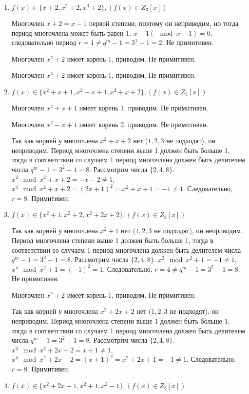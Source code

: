 \documentclass[12pt]{extarticle}
\begin{document}
\begin{enumerate}
    \item $f(x)\in\{x+2, x^2+2, x^3+2\}, (f(x)\in Z_3[x])$
    
     Многочлен $x+2 = x-1$ первой степени, поэтому он неприводим, но тогда период многочлена может быть равен 1. $x - 1 (\mod{x - 1}) = 0$, следовательно период $r = 1 \neq q^m - 1 = 3^1 -1 = 2$. Не примитивен.
     
     Многочлен $ x^2+2$ имеет корень 1, приводим. Не примитивен.
     
     Многочлен $ x^3+2$ имеет корень 1, приводим. Не примитивен.

    \item $f(x)\in\{x^2+x+1, x^2-x+1, x^2+x+2\}, (f(x)\in Z_3[x])$
    
    Многочлен $ x^2+x+1$ имеет корень 1, приводим. Не примитивен.
    
    Многочлен $ x^2-x+1$ имеет корень 2, приводим. Не примитивен.
    
    Так как корней у многочлена $x^2+x+2$ нет ($1,2,3$ не подходят), он неприводим. Период многочлена степени выше 1 должен быть больше 1, тогда в соответствии со случаем 1 период многочлена должен быть делителем числа $q^m -1 = 3^2 -1 = 8$. Рассмотрим числа $\{2, 4, 8\}$. $x^2 \mod x^2 + x +2 = - x - 2 \neq 1$,  $x^4 \mod x^2 + x +2 = (2x + 1)^2 = x^2 + x + 1 = - 1 \neq 1$. Следовательно, $r=8$. Примитивен.

    \item $f(x)\in\{x^2+1, x^2+2, x^2+2x+2\}, (f(x)\in Z_3[x])$
    
    Так как корней у многочлена $x^2+1$ нет ($1,2,3$ не подходят), он неприводим. Период многочлена степени выше 1 должен быть больше 1, тогда в соответствии со случаем 1 период многочлена должен быть делителем числа $q^m -1 = 3^2 -1 = 8$. Рассмотрим числа $\{2, 4, 8\}$. $x^2 \mod x^2 + 1 = -1 \neq 1$,  $x^4 \mod x^2 + 1 = (-1)^2 = 1$. Следовательно, $r=4\neq q^m -1 = 3^2 -1 = 8$. Не примитивен.
    
    Многочлен $ x^2+2$ имеет корень 1, приводим. Не примитивен.
    
    Так как корней у многочлена $x^2+2x+2$ нет ($1,2,3$ не подходят), он неприводим. Период многочлена степени выше 1 должен быть больше 1, тогда в соответствии со случаем 1 период многочлена должен быть делителем числа $q^m -1 = 3^2 -1 = 8$. Рассмотрим числа $\{2, 4, 8\}$. $x^2 \mod x^2 + 2x +2 = x +1 \neq 1$,  $x^4 \mod x^2 + 2x +2 = (x +1)^2 = x^2 + 2x + 1 = - 1 \neq 1$. Следовательно, $r=8$. Примитивен.

    \item $f(x)\in\{x^2+2x+1, x^2+1, x^2-1\}, (f(x)\in Z_3[x])$
    

\end{enumerate}
\end{document}
